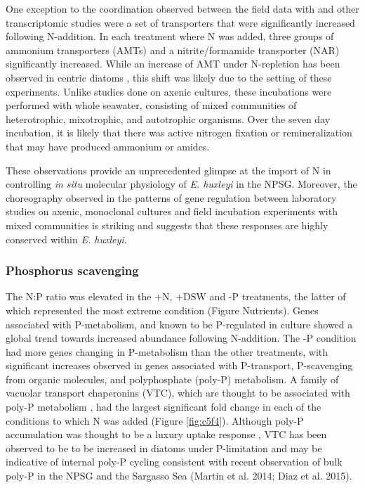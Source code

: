 One exception to the coordination observed between the field data with \citet{McKew2015} and other transcriptomic studies \citep{Dyhrman2006, Rokitta2014} were a set of transporters that were significantly increased following N-addition. In each treatment where N was added, three groups of ammonium transporters (AMTs) and a nitrite/formamide transporter (NAR) significantly increased. While an increase of AMT under N-repletion has been observed in centric diatoms \citep{Bender2014}, this shift was likely due to the setting of these experiments. Unlike studies done on axenic cultures, these incubations were performed with whole seawater, consisting of mixed communities of heterotrophic, mixotrophic, and autotrophic organisms. Over the seven day incubation, it is likely that there was active nitrogen fixation \citep{Karl1997} or remineralization \citep{Casciotti2008} that may have produced ammonium or amides. \par

These observations provide an unprecedented glimpse at the import of N in controlling \textit{in situ} molecular physiology of \textit{E. huxleyi} in the NPSG. Moreover, the choreography observed in the patterns of gene regulation between laboratory studies on axenic, monoclonal cultures and field incubation experiments with mixed communities is striking and suggests that these responses are highly conserved within \textit{E. huxleyi}. \par


\subsubsection{Phosphorus scavenging}

The N:P ratio was elevated in the +N, +DSW and -P treatments, the latter of which represented the most extreme condition (Figure Nutrients). Genes associated with P-metabolism, and known to be P-regulated in culture \citep{Dyhrman2006, McKew2015} showed a global trend towards increased abundance following N-addition. The -P condition had more genes changing in P-metabolism than the other treatments, with significant increases observed in genes associated with P-transport, P-scavenging from organic molecules, and polyphosphate (poly-P) metabolism. A family of vacuolar transport chaperonins (VTC), which are thought to be associated with poly-P metabolism \citep{Ogawa2000, Hothorn2009, Dyhrman2012}, had the largest significant fold change in each of the conditions to which N was added (Figure \ref{fig:c5f4}). Although poly-P accumulation was thought to be a luxury uptake response \citep{Perry1976}, VTC has been observed to be to be increased in diatoms under P-limitation \citep{Dyhrman2006, Dyhrman2012} and may be indicative of internal poly-P cycling consistent with recent observation of bulk poly-P in the NPSG and the Sargasso Sea (Martin et al. 2014; Diaz et al. 2015). \par

